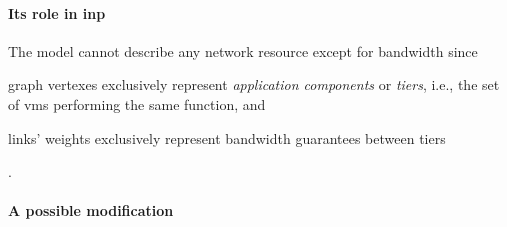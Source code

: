 %
%
\paragraph{Its role in \texorpdfstring{\gls{inp}}{INP}}
The model cannot describe any network resource except for bandwidth since
\begin{mylist}
    \item graph vertexes exclusively represent \textit{application components} or \textit{tiers}, i.e., the set of \glspl{vm} performing the same function, and
    \item links' weights exclusively represent bandwidth guarantees between tiers
\end{mylist}.

\paragraph{A possible modification}